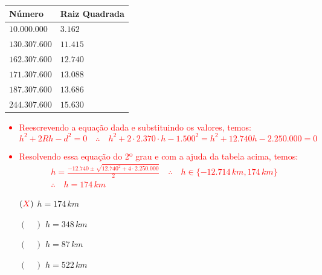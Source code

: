 \documentclass[a4paper, 12pt]{article}
\newcommand{\red}[1]{\textcolor{red}{#1}}
\begin{document}
\begin{flushleft}
\begin{itemize}
\begin{itemize}
\begin{figure}[H]
                        \end{figure}
                        \begin{center} \begin{tabular}
                        {
                            |M{0.3\textwidth}|M{0.3\textwidth}|
                        }
                            \hline
                            Número & Raiz Quadrada \\ \hline
                            $10.000.000$ & $3.162$ \\ \hline
                            $130.307.600$ & $11.415$ \\ \hline
                            $162.307.600$ & $12.740$ \\ \hline
                            $171.307.600$  & $13.088$ \\ \hline
                            $187.307.600$ & $13.686$ \\ \hline
                            $244.307.600$ & $15.630$ \\ \hline
                        \end{tabular} \end{center}
                        \red{\begin{itemize}
                            \item Reescrevendo a equação dada e substituindo os valores, temos:
                                \begin{equation*}
                                    h^2+2Rh-d^2=0 \quad \therefore \quad h^2 + 2 \cdot 2.370 \cdot h - 1.500^2 = h^2+12.740h-2.250.000=0
                                \end{equation*}
                            \item Resolvendo essa equação do 2º grau e com a ajuda da tabela acima, temos:
                                \begin{equation*} \begin{gathered}
                                    h=\frac{-12.740 \pm \sqrt{12.740^2+4 \cdot 2.250.000}}{2} \quad \therefore \quad h \in \{-12.714 \, km, 174 \, km\} \\
                                    \therefore \quad h=174 \, km
                                \end{gathered} \end{equation*}
                        \end{itemize}}
                        \begin{itemize}
                            \item[$(\red{X})$] $h = 174 \, km$
                            \item[$(\quad)$] $h = 348 \, km$
                            \item[$(\quad)$] $h = 87 \, km$
                            \item[$(\quad)$] $h = 522 \, km$
                        \end{itemize}
                \end{itemize}
        \end{itemize} \end{flushleft}
\end{document}
